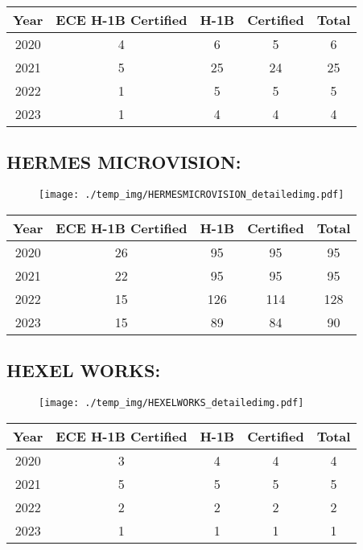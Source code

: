 \documentclass{article}%
\begin{document}
%
\begin{longtable}{c|c|c|c|c}%
\hline%
Year&ECE H{-}1B Certified&H{-}1B&Certified&Total\\%
\hline%
2020&4&6&5&6\\%
\hline%
2021&5&25&24&25\\%
\hline%
2022&1&5&5&5\\%
\hline%
2023&1&4&4&4\\%
\hline%
\end{longtable}

%
\newpage%
\subsection{HERMES MICROVISION:}%
\label{subsec:HERMESMICROVISION}%
\label{HERMESMICROVISIONdetailed}%


\begin{figure}[htbp]%
\centering%
\texttt{[image: ./temp\_img/HERMESMICROVISION\_detailedimg.pdf]}%
\end{figure}

%
\begin{longtable}{c|c|c|c|c}%
\hline%
Year&ECE H{-}1B Certified&H{-}1B&Certified&Total\\%
\hline%
2020&26&95&95&95\\%
\hline%
2021&22&95&95&95\\%
\hline%
2022&15&126&114&128\\%
\hline%
2023&15&89&84&90\\%
\hline%
\end{longtable}

%
\newpage%
\subsection{HEXEL WORKS:}%
\label{subsec:HEXELWORKS}%
\label{HEXELWORKSdetailed}%


\begin{figure}[htbp]%
\centering%
\texttt{[image: ./temp\_img/HEXELWORKS\_detailedimg.pdf]}%
\end{figure}

%
\begin{longtable}{c|c|c|c|c}%
\hline%
Year&ECE H{-}1B Certified&H{-}1B&Certified&Total\\%
\hline%
2020&3&4&4&4\\%
\hline%
2021&5&5&5&5\\%
\hline%
2022&2&2&2&2\\%
\hline%
2023&1&1&1&1\\%
\hline%
\end{longtable}
\end{document}
